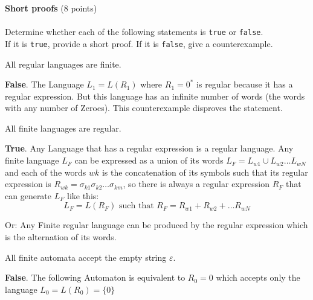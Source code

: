 \documentclass[12pt]{article}
\newenvironment{question}[2][Question]{\begin{trivlist}
\item[\hskip \labelsep {\bfseries #1}\hskip \labelsep {\bfseries #2.}]}{\end{trivlist}}
\newenvironment{solution}[1][Solution:]{\begin{trivlist}
\item[\hskip \labelsep {\bfseries #1}\hskip \labelsep {\bfseries}]\color{blue}}{\end{trivlist}}
\begin{document}
\clearpage
\begin{question}{6}\textbf{Short proofs} (8 points)\\\\
Determine whether each of the following statements is \texttt{true} or \texttt{false}.\\ If it is \texttt{true}, provide a short proof. If it is \texttt{false}, give a counterexample.
\begin{enumerate}[(a)]
\item All regular languages are finite.
\begin{solution}
    \textbf{False}. The Language $L_1 = L(R_1)$ where $R_1 = 0^*$ is regular because it has a regular expression. But this language has an infinite number of words (the words with any number of Zeroes). This counterexample disproves the statement.
\end{solution}

\item All finite languages are regular.
\begin{solution}
    \textbf{True}. Any Language that has a regular expression is a regular language. Any finite language $L_F$ can be expressed as a union of its words $L_F = L_{w1} \cup L_{w2} \dots L_{wN}$ and each of the words $wk$ is the concatenation of its symbols such that its regular expression is $R_{wk} = \sigma_{k1} \sigma_{k2} \dots \sigma_{km}$, so there is always a regular expression $R_F$ that can generate $L_F$ like this:
    $$
    L_F = L(R_F) \text{ such that } R_F = R_{w1} + R_{w2} + \dots R_{wN}
    $$

    Or: Any Finite regular language can be produced by the regular expression which is the alternation of its words.
\end{solution}

\item All finite automata accept the empty string $\varepsilon$.
\begin{solution}
    \textbf{False}. The following Automaton is equivalent to $R_0 = 0$ which accepts only the language $L_0 = L(R_0) = \{0\}$

\begin{center}
\end{center}


\end{solution}
\end{enumerate}
\end{question}
\end{document}

